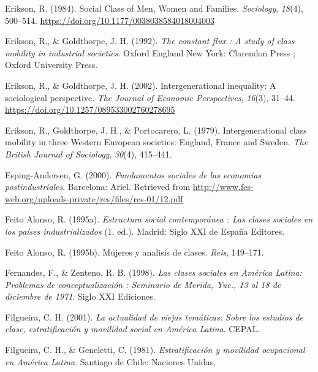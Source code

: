 \documentclass[
]{article}
\newlength{\cslhangindent}
\newlength{\cslentryspacingunit} %
\newenvironment{CSLReferences}[2] %
 {%
  \setlength{\parindent}{0pt}
  \ifodd #1
  \let\oldpar\par
  \def\par{\hangindent=\cslhangindent\oldpar}
  \fi
  \setlength{\parskip}{#2\cslentryspacingunit}
 }%
 {}
\begin{document}
\begin{CSLReferences}{1}{0}
\leavevmode{}%
Erikson, R. (1984). Social {Class} of {Men}, {Women} and {Families}. \emph{Sociology}, \emph{18}(4), 500--514. \url{https://doi.org/10.1177/0038038584018004003}

\leavevmode{}%
Erikson, R., \& Goldthorpe, J. H. (1992). \emph{The constant flux : A study of class mobility in industrial societies}. Oxford England New York: Clarendon Press ; Oxford University Press.

\leavevmode{}%
Erikson, R., \& Goldthorpe, J. H. (2002). Intergenerational inequality: {A} sociological perspective. \emph{The Journal of Economic Perspectives}, \emph{16}(3), 31--44. \url{https://doi.org/10.1257/089533002760278695}

\leavevmode{}%
Erikson, R., Goldthorpe, J. H., \& Portocarero, L. (1979). Intergenerational class mobility in three {Western} {European} societies: {England}, {France} and {Sweden}. \emph{The British Journal of Sociology}, \emph{30}(4), 415--441.

\leavevmode{}%
Esping-Andersen, G. (2000). \emph{Fundamentos sociales de las economías postindustriales}. Barcelona: Ariel. Retrieved from \url{http://www.fes-web.org/uploads-private/res/files/res-01/12.pdf}

\leavevmode{}%
Feito Alonso, R. (1995a). \emph{Estructura social contemporánea : Las clases sociales en los países industrializados} (1. ed.). Madrid: Siglo XXI de España Editores.

\leavevmode{}%
Feito Alonso, R. (1995b). Mujeres y analisis de clases. \emph{Reis}, 149--171.

\leavevmode{}%
Fernandes, F., \& Zenteno, R. B. (1998). \emph{Las clases sociales en {América} {Latina}: Problemas de conceptualización : Seminario de {Merida}, {Yuc}., 13 al 18 de diciembre de 1971}. Siglo XXI Ediciones.

\leavevmode{}%
Filgueira, C. H. (2001). \emph{La actualidad de viejas temáticas: Sobre los estudios de clase, estratificación y movilidad social en {América} {Latina}}. CEPAL.

\leavevmode{}%
Filgueira, C. H., \& Geneletti, C. (1981). \emph{Estratificación y movilidad ocupacional en {América} {Latina}}. Santiago de Chile: Naciones Unidas.


\end{CSLReferences}
\end{document}

